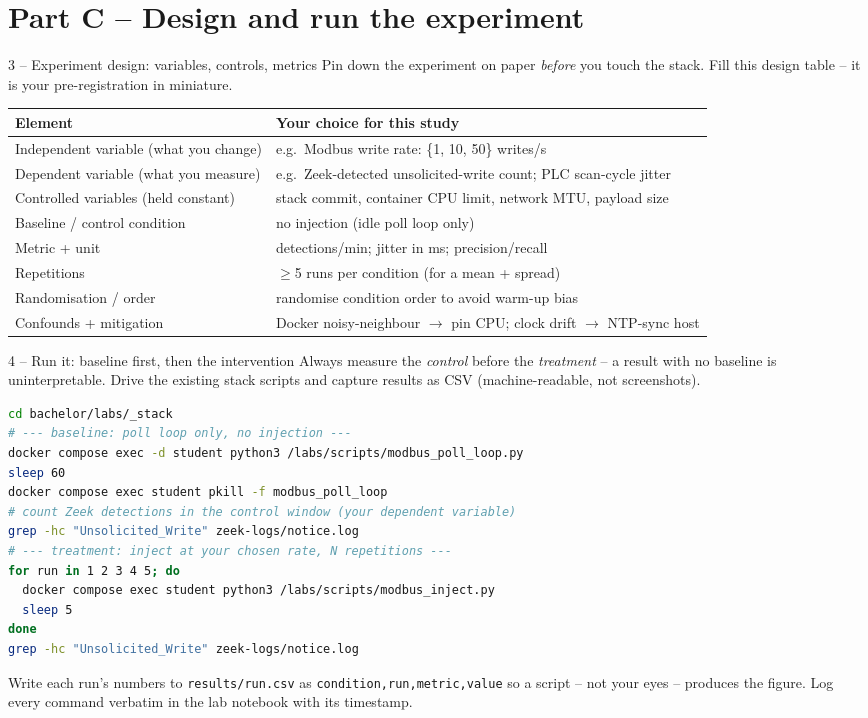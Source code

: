 \documentclass[11pt,a4paper]{article}
\begin{document}
\section*{Part C -- Design and run the experiment}

\begin{stepbox}{3 -- Experiment design: variables, controls, metrics}
Pin down the experiment on paper \emph{before} you touch the stack. Fill this design table -- it is your pre-registration in miniature.

\vspace{1mm}
{\footnotesize
\begin{tabular}{@{}p{4.0cm}p{11.4cm}@{}}
\toprule
\textbf{Element} & \textbf{Your choice for this study} \\
\midrule
Independent variable (what you change) & e.g.\ Modbus write rate: \{1, 10, 50\} writes/s \\
Dependent variable (what you measure)  & e.g.\ Zeek-detected unsolicited-write count; PLC scan-cycle jitter \\
Controlled variables (held constant)   & stack commit, container CPU limit, network MTU, payload size \\
Baseline / control condition           & no injection (idle poll loop only) \\
Metric + unit                          & detections/min; jitter in ms; precision/recall \\
Repetitions                            & $\geq$5 runs per condition (for a mean + spread) \\
Randomisation / order                  & randomise condition order to avoid warm-up bias \\
Confounds + mitigation                 & Docker noisy-neighbour $\to$ pin CPU; clock drift $\to$ NTP-sync host \\
\bottomrule
\end{tabular}}
\end{stepbox}

\begin{stepbox}{4 -- Run it: baseline first, then the intervention}
Always measure the \emph{control} before the \emph{treatment} -- a result with no baseline is uninterpretable. Drive the existing stack scripts and capture results as CSV (machine-readable, not screenshots).
\begin{lstlisting}[language=bash]
cd bachelor/labs/_stack
# --- baseline: poll loop only, no injection ---
docker compose exec -d student python3 /labs/scripts/modbus_poll_loop.py
sleep 60
docker compose exec student pkill -f modbus_poll_loop
# count Zeek detections in the control window (your dependent variable)
grep -hc "Unsolicited_Write" zeek-logs/notice.log
# --- treatment: inject at your chosen rate, N repetitions ---
for run in 1 2 3 4 5; do
  docker compose exec student python3 /labs/scripts/modbus_inject.py
  sleep 5
done
grep -hc "Unsolicited_Write" zeek-logs/notice.log
\end{lstlisting}
Write each run's numbers to \texttt{results/run.csv} as \texttt{condition,run,metric,value} so a script -- not your eyes -- produces the figure. Log every command verbatim in the lab notebook with its timestamp.
\end{stepbox}
\end{document}
